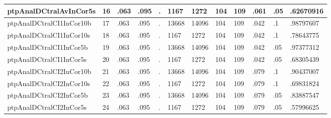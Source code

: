 \begin{table}[htbp]
\begin{tabular}{|l|l|l|l|l|l|l|l|l|l|l|l|}
ptpAnalDCtralAvInCor5s & 16 & .063 & .095 & . & 1167 & 1272 & 104 & 109 & .061 & .05 & .62670916 \\ \hline 
ptpAnalDCtralCI1InCor10b & 17 & .063 & .095 & . & 13668 & 14096 & 104 & 109 & .042 & .1 & .98797607 \\ \hline 
ptpAnalDCtralCI1InCor10s & 18 & .063 & .095 & . & 1167 & 1272 & 104 & 109 & .042 & .1 & .78643775 \\ \hline 
ptpAnalDCtralCI1InCor5b & 19 & .063 & .095 & . & 13668 & 14096 & 104 & 109 & .042 & .05 & .97377312 \\ \hline 
ptpAnalDCtralCI1InCor5s & 20 & .063 & .095 & . & 1167 & 1272 & 104 & 109 & .042 & .05 & .68305439 \\ \hline 
ptpAnalDCtralCI2InCor10b & 21 & .063 & .095 & . & 13668 & 14096 & 104 & 109 & .079 & .1 & .90437007 \\ \hline 
ptpAnalDCtralCI2InCor10s & 22 & .063 & .095 & . & 1167 & 1272 & 104 & 109 & .079 & .1 & .69831824 \\ \hline 
ptpAnalDCtralCI2InCor5b & 23 & .063 & .095 & . & 13668 & 14096 & 104 & 109 & .079 & .05 & .83887547 \\ \hline 
ptpAnalDCtralCI2InCor5s & 24 & .063 & .095 & . & 1167 & 1272 & 104 & 109 & .079 & .05 & .57996625 \\ \hline 
  \end{tabular}
\end{table}
